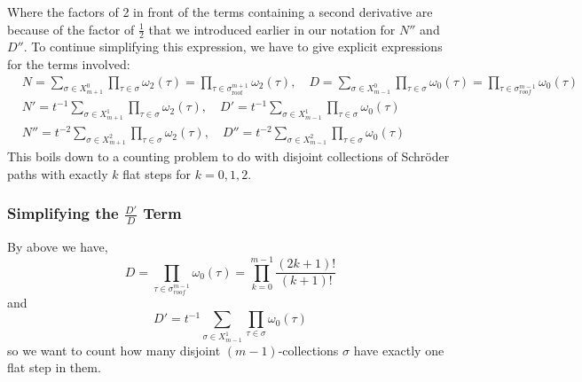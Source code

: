 \documentclass[11pt]{article}
\theoremstyle{definition}
\theoremstyle{definition}
\theoremstyle{plain}
\theoremstyle{plain}
\theoremstyle{plain}
\theoremstyle{definition}
\begin{document}
Where the factors of 2 in front of the terms containing a second derivative are because of the factor of $\frac{1}{2}$ that we introduced earlier in our notation for $N''$ and $D''$. To continue simplifying this expression, we have to give explicit expressions for the terms involved:
\begin{align*}
&N = \sum\limits_{\sigma\in X_{m+1}^0}\prod\limits_{\tau\in\sigma}\omega_2(\tau) = \prod\limits_{\tau\in\sigma_{\text{roof}}^{m+1}}\omega_2(\tau),\quad D = \sum\limits_{\sigma\in X_{m-1}^0}\prod\limits_{\tau\in\sigma}\omega_0(\tau) = \prod\limits_{\tau\in\sigma_{roof}^{m-1}}\omega_0(\tau) \\
&N' = t^{-1}\sum\limits_{\sigma\in X_{m+1}^1}\prod\limits_{\tau\in\sigma}\omega_2(\tau),\quad D' = t^{-1}\sum\limits_{\sigma\in X_{m-1}^1}\prod\limits_{\tau\in\sigma}\omega_0(\tau) \\
&N'' = t^{-2}\sum\limits_{\sigma\in X_{m+1}^2}\prod\limits_{\tau\in\sigma}\omega_2(\tau),\quad D'' = t^{-2}\sum\limits_{\sigma\in X_{m-1}^2}\prod\limits_{\tau\in\sigma}\omega_0(\tau)
\end{align*}
This boils down to a counting problem to do with disjoint collections of Schröder paths with exactly $k$ flat steps for $k = 0,1,2$.

\subsubsection*{Simplifying the $\frac{D'}{D}$ Term}

By above we have,
\begin{equation*}
D = \prod\limits_{\tau\in\sigma_{roof}^{m-1}}\omega_0(\tau) = \prod\limits_{k=0}^{m-1}\frac{(2k+1)!}{(k+1)!}
\end{equation*}
and
\begin{equation*}
D' = t^{-1}\sum\limits_{\sigma\in X_{m-1}^1}\prod\limits_{\tau\in\sigma}\omega_0(\tau)
\end{equation*}
so we want to count how many disjoint $(m-1)$-collections $\sigma$ have exactly one flat step in them.
\end{document}
